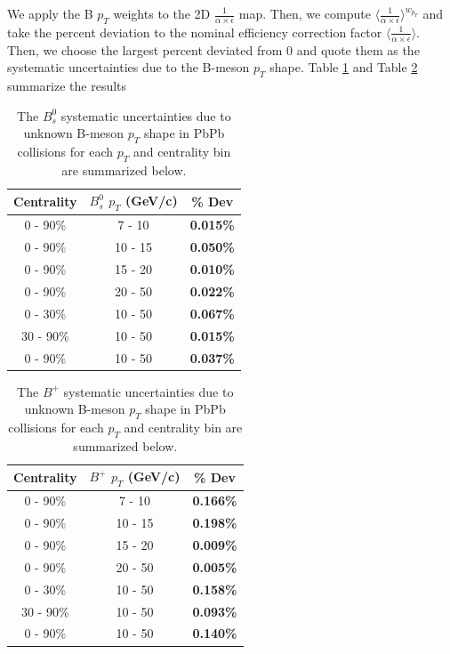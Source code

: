 We apply the B $p_T$ weights to the 2D $\frac{1}{\alpha \times \epsilon}$ map. Then, we compute $\langle\frac{1}{\alpha \times \epsilon}\rangle^{w_{p_T}}$ and take the percent deviation to the nominal efficiency correction factor $\langle\frac{1}{\alpha \times \epsilon}\rangle$. Then, we choose the largest percent deviated from 0 and quote them as the systematic uncertainties due to the B-meson $p_T$ shape. Table \ref{BsPTShape} and Table \ref{BPPTShape} summarize the results 


\begin{table}[h]
\begin{center}
\caption{The $B^0_s$ systematic uncertainties due to unknown B-meson $p_T$ shape in PbPb collisions for each $p_T$ and centrality bin are summarized below.}
\vspace{1em}
\label{BsPTShape}
  \begin{tabular}{| c | c |c |}
    \hline
     Centrality & $B^0_s$ $p_T$ (GeV/c) & \% Dev \\
    \hline
    \hline
0 - 90\% & 7 - 10 &   \textbf{0.015\% }     \\ 
0 - 90\% & 10 - 15 & \textbf{0.050\% }    \\ 
0 - 90\% & 15 - 20 &  \textbf{0.010\% }     \\ 
0 - 90\% & 20 - 50 &  \textbf{0.022\% }    \\ 
0 - 30\% & 10 - 50 &   \textbf{0.067\% }  \\ 
30 - 90\% & 10 - 50 & \textbf{0.015\% }    \\ 
0 - 90\% & 10 - 50 &  \textbf{0.037\% }   \\ 
    \hline
    \hline
\end{tabular}
\end{center}
\end{table}



\begin{table}[h]
\begin{center}
\caption{The $B^+$ systematic uncertainties due to unknown B-meson $p_T$ shape in PbPb collisions for each $p_T$ and centrality bin are summarized below.}
\vspace{1em}
\label{BPPTShape}
  \begin{tabular}{| c | c |c |}
    \hline
     Centrality & $B^+$ $p_T$ (GeV/c) & \% Dev \\
    \hline
    \hline
0 - 90\% & 7 - 10 &   \textbf{0.166\% }     \\ 
0 - 90\% & 10 - 15 & \textbf{0.198\% }    \\ 
0 - 90\% & 15 - 20 &  \textbf{0.009\% }     \\ 
0 - 90\% & 20 - 50 &  \textbf{0.005\% }    \\ 
0 - 30\% & 10 - 50 &   \textbf{0.158\% }  \\ 
30 - 90\% & 10 - 50 & \textbf{0.093\% }    \\ 
0 - 90\% & 10 - 50 &  \textbf{0.140\% }   \\ 
    \hline
    \hline
\end{tabular}
\end{center}
\end{table}

